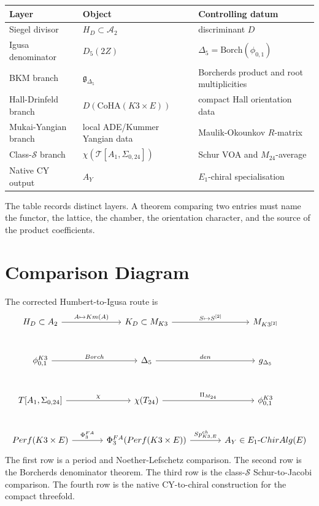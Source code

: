 \documentclass[11pt]{article}
\providecommand{\cA}{\mathcal{A}}
\providecommand{\cM}{\mathcal{M}}
\providecommand{\cS}{\mathcal{S}}
\providecommand{\cT}{\mathcal{T}}
\providecommand{\fg}{\mathfrak{g}}
\providecommand{\Borch}{\mathrm{Borch}}
\providecommand{\ChirAlg}{\mathrm{ChirAlg}}
\providecommand{\CoHA}{\mathrm{CoHA}}
\providecommand{\Km}{\mathrm{Km}}
\providecommand{\Perf}{\mathrm{Perf}}
\providecommand{\SpCh}{\mathrm{Sp}^{\mathrm{ch}}}
\providecommand{\PhiFA}{\Phi^{\mathrm{FA}}}
\providecommand{\Dfive}{\Delta_5}
\begin{document}
\begin{center}
\renewcommand{\arraystretch}{1.25}
\begin{tabular}{lll}
\hline
Layer & Object & Controlling datum \\
\hline
Siegel divisor & \(H_D\subset\cA_2\) & discriminant \(D\) \\
Igusa denominator & \(D_5(2Z)\) & \(\Dfive=\Borch(\phi_{0,1})\) \\
BKM branch & \(\fg_{\Dfive}\) & Borcherds product and root multiplicities \\
Hall-Drinfeld branch & \(D(\CoHA(K3\times E))\) & compact Hall orientation data \\
Mukai-Yangian branch & local ADE/Kummer Yangian data & Maulik-Okounkov \(R\)-matrix \\
Class-\(\cS\) branch & \(\chi(\cT[A_1,\Sigma_{0,24}])\) & Schur VOA and \(M_{24}\)-average \\
Native CY output & \(A_Y\) & \(E_1\)-chiral specialisation \\
\hline
\end{tabular}
\end{center}

The table records distinct layers.  A theorem comparing two entries must
name the functor, the lattice, the chamber, the orientation character,
and the source of the product coefficients.

\section{Comparison Diagram}

The corrected Humbert-to-Igusa route is
\[
\begin{tikzcd}[column sep=large,row sep=large]
H_D\subset\cA_2
  \arrow[r,"A\mapsto\Km(A)"]
&
\cK_D\subset\cM_{K3}
  \arrow[r,"S\mapsto S^{[2]}"]
&
\cM_{K3^{[2]}}
\\
\phi_{0,1}^{K3}
  \arrow[r,"\Borch"]
&
\Dfive
  \arrow[r,"\operatorname{den}"]
&
\fg_{\Dfive}
\\
\cT[A_1,\Sigma_{0,24}]
  \arrow[r,"\chi"]
&
\chi(\cT_{24})
  \arrow[r,"\Pi_{M_{24}}"]
&
\phi_{0,1}^{K3}
\\
\Perf(K3\times E)
  \arrow[r,"\PhiFA_3"]
&
\PhiFA_3(\Perf(K3\times E))
  \arrow[r,"\SpCh_{K3,E}"]
&
A_Y\in E_1\text{-}\ChirAlg(E)
\end{tikzcd}
\]
The first row is a period and Noether-Lefschetz comparison.  The second
row is the Borcherds denominator theorem.  The third row is the
class-\(\cS\) Schur-to-Jacobi comparison.  The fourth row is the native
CY-to-chiral construction for the compact threefold.
\end{document}
